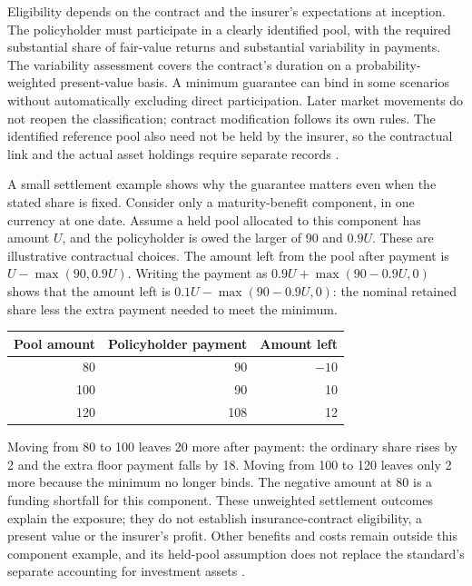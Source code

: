 Eligibility depends on the contract and the insurer's expectations at inception.
The policyholder must participate in a clearly identified pool, with the
required substantial share of fair-value returns and substantial variability
in payments. The variability assessment covers the contract's duration on a
probability-weighted present-value basis. A minimum guarantee can bind in some
scenarios without automatically excluding direct participation. Later market
movements do not reopen the classification; contract modification follows its
own rules. The identified reference pool also need not be held by the insurer,
so the contractual link and the actual asset holdings require separate records
\citep[paragraphs B101--B108 and 72]{aasb17}.

\clearpage
A small settlement example shows why the guarantee matters even when the
stated share is fixed. Consider only a maturity-benefit component, in one
currency at one date. Assume a held pool allocated to this component has amount
$U$, and the policyholder is owed the larger of 90 and $0.9U$. These are
illustrative contractual choices. The amount left from the pool after payment
is $U-\max(90,0.9U)$. Writing the payment as
$0.9U+\max(90-0.9U,0)$ shows that the amount left is
$0.1U-\max(90-0.9U,0)$: the nominal retained share less the extra payment
needed to meet the minimum.

\begin{center}
\begin{tabular}{@{}rrr@{}}
\toprule
Pool amount & Policyholder payment & Amount left\\
\midrule
80 & 90 & $-10$\\
100 & 90 & 10\\
120 & 108 & 12\\
\bottomrule
\end{tabular}
\end{center}

Moving from 80 to 100 leaves 20 more after payment: the ordinary share rises
by 2 and the extra floor payment falls by 18. Moving from 100 to 120 leaves
only 2 more because the minimum no longer binds. The negative amount at 80
is a funding shortfall for this component. These unweighted settlement
outcomes explain the exposure; they do not establish insurance-contract
eligibility, a present value or the insurer's profit. Other benefits and costs
remain outside this component example, and its held-pool assumption does not
replace the standard's separate accounting for investment assets
\citep[paragraphs B66(a), B107--B108]{aasb17}.


